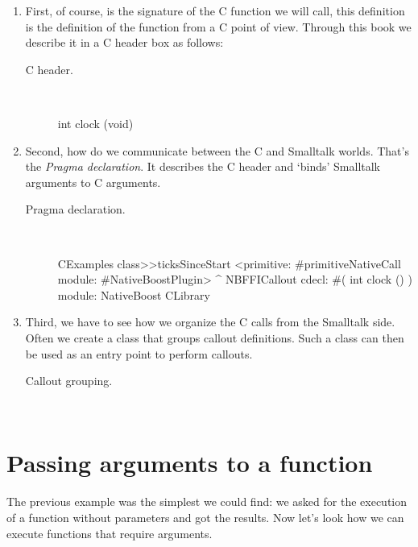 \documentclass[a4paper,10pt,twoside]{book}
\begin{document}
\begin{enumerate}

\item First, of course, is the signature of the C function we will call, this definition is the definition of the function from a C point of view. Through this book we describe it in a C header box as follows:

\begin{description}
\item [C header.] \ 

\begin{code}{}
int clock (void)
\end{code}
\end{description}


\item Second, how do we communicate between the C and Smalltalk worlds. That's the \emph{Pragma declaration}. It describes the C header and `binds' Smalltalk arguments to C arguments. 

\begin{description}
\item [Pragma declaration.] \ 

\begin{code}{}
CExamples class>>ticksSinceStart
	<primitive: #primitiveNativeCall module: #NativeBoostPlugin>
	^ NBFFICallout cdecl: #( int clock () ) module: NativeBoost CLibrary
\end{code}

\end{description}

\item Third, we have to see how we organize the C calls from the Smalltalk side. Often we create a class that groups callout definitions. Such a class can then be used as an entry point to perform callouts.

\begin{description}
\item [Callout grouping.] \

\end{description}

\end{enumerate}

\section{Passing arguments to a function}

The previous example was the simplest we could find: we asked for the execution of a function without parameters and got the results. Now let's look how we can execute functions that require arguments. 
\end{document}
